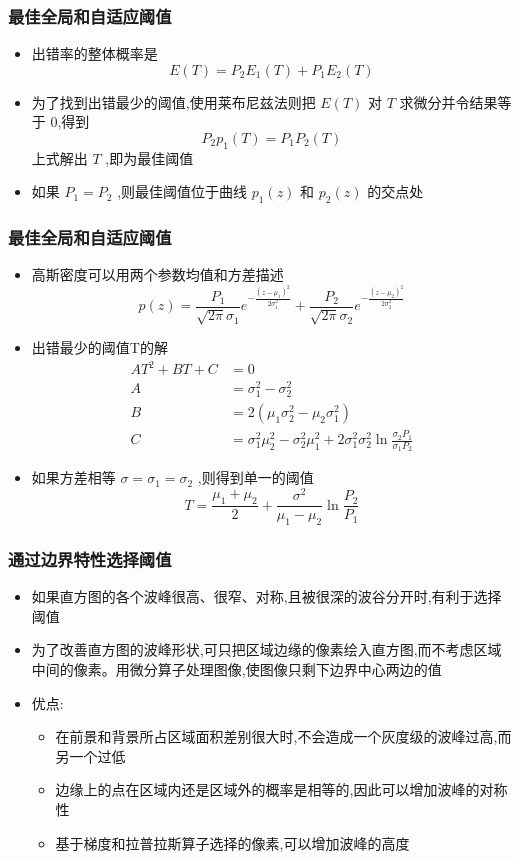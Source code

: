 \documentclass{beamer}
\begin{document}
\begin{frame}
\frametitle{最佳全局和自适应阈值}
\label{sec-4-8}

\begin{itemize}
\item 出错率的整体概率是
   \[ E(T)=P_2E_1(T)+P_1E_2(T) \]
\item 为了找到出错最少的阈值,使用莱布尼兹法则把 $E(T)$ 对 $T$ 求微分并令结果等于 0,得到
   \[ P_2 p_1(T) =P_1 P_2(T)\]
    上式解出 $T$ ,即为最佳阈值
\item 如果 $P_1=P_2$ ,则最佳阈值位于曲线 $p_1(z)$ 和 $p_2(z)$ 的交点处
\end{itemize}
\end{frame}
\begin{frame}
\frametitle{最佳全局和自适应阈值}
\label{sec-4-9}

\begin{itemize}
\item 高斯密度可以用两个参数均值和方差描述
    \[ p(z)=\frac{P_1}{\sqrt{2\pi}\sigma_1}e^{-\frac{(z-\mu_1)^2}{2\sigma_1^2}}+\frac{P_2}{\sqrt{2\pi}\sigma_2}e^{-\frac{(z-\mu_2)^2}{2\sigma_2^2}}\]
\item 出错最少的阈值T的解
     \begin{align*}
       A T^2+BT+C &=0 \\
        A &= \sigma_1^2-\sigma_2^2 \\
        B &= 2(\mu_1\sigma_2^2-\mu_2\sigma_1^2)\\
        C &= \sigma_1^2\mu_2^2-\sigma_2^2\mu_1^2+2\sigma_1^2\sigma_2^2\ln\frac{\sigma_2P_1}{\sigma_1P_2}
     \end{align*}
\item 如果方差相等 $\sigma=\sigma_1=\sigma_2$ ,则得到单一的阈值
     \[ T=\frac{\mu_1+\mu_2}{2}+\frac{\sigma^2}{\mu_1-\mu_2}\ln \frac{P_2}{P_1} \]
\end{itemize}
\end{frame}
\begin{frame}
\frametitle{通过边界特性选择阈值}
\label{sec-4-10}

\begin{itemize}
\item 如果直方图的各个波峰很高、很窄、对称,且被很深的波谷分开时,有利于选择阈值
\item 为了改善直方图的波峰形状,可只把区域边缘的像素绘入直方图,而不考虑区域中间的像素。用微分算子处理图像,使图像只剩下边界中心两边的值
\item 优点:
\begin{itemize}
\item 在前景和背景所占区域面积差别很大时,不会造成一个灰度级的波峰过高,而另一个过低
\item 边缘上的点在区域内还是区域外的概率是相等的,因此可以增加波峰的对称性
\item 基于梯度和拉普拉斯算子选择的像素,可以增加波峰的高度
\end{itemize}
\end{itemize}
\end{frame}
\end{document}
